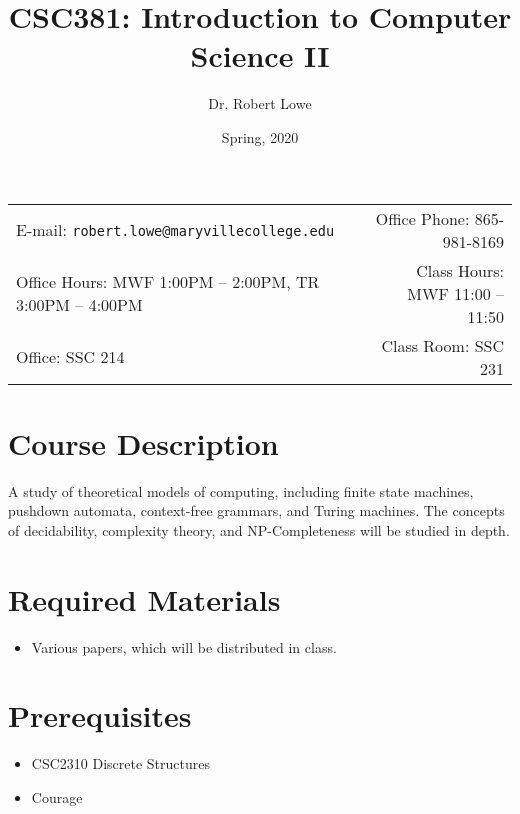\documentclass[11pt]{article}
\title{CSC381: Introduction to Computer Science II}
\author{Dr. Robert Lowe}
\date{Spring, 2020}
\newcommand{\blankline}{\quad\pagebreak[2]}
\begin{document}
\maketitle

\blankline

\begin{tabular*}{.93\textwidth}{@{\extracolsep{\fill}}lr}

E-mail: \texttt{robert.lowe@maryvillecollege.edu} & Office Phone: 865-981-8169 \\

 Office Hours: MWF 1:00PM -- 2:00PM, TR 3:00PM -- 4:00PM  &  Class
 Hours: MWF 11:00 -- 11:50\\
 Office: SSC 214 & Class Room: SSC 231\\
\hline
\end{tabular*}

\vspace{5 mm}

\section*{Course Description}
A study of theoretical models of computing, including finite state
machines, pushdown automata, context-free grammars, and Turing
machines. The concepts of decidability, complexity theory, and
NP-Completeness will be studied in depth. 


\section*{Required Materials}
\begin{itemize}
    \item Various papers, which will be distributed in class.
\end{itemize}

\section*{Prerequisites}
\begin{itemize}
    \item CSC2310 Discrete Structures
    \item Courage
\end{itemize}
\end{document}
